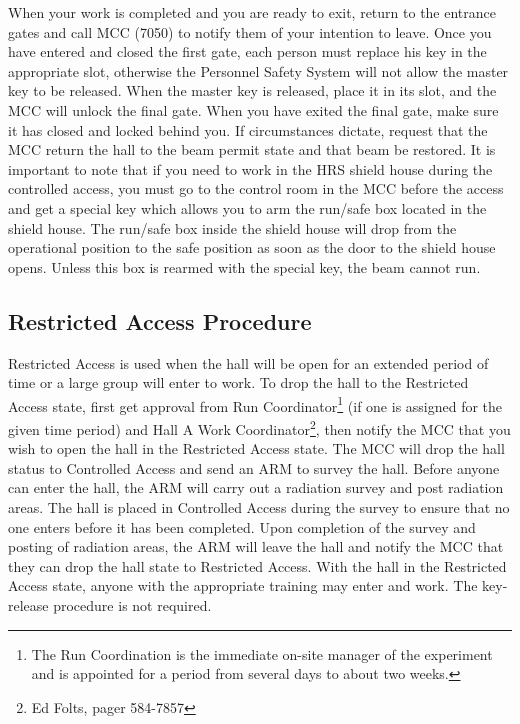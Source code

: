 When your work is completed and you are ready to exit, return to the
entrance gates and call MCC (7050) to notify them of your intention to leave.
 Once you have entered and closed the first gate, each person must
replace his key in the appropriate slot, otherwise the Personnel
Safety System will not allow the master key to be released. When the
master key is released, place it in its slot, and the MCC will unlock
the final gate. When you have exited the final gate, make sure it has
closed and locked behind you. If circumstances dictate, request that
the MCC return the hall to the beam permit state and that beam be
restored.  It is important to note that if you need to work in the HRS
shield house during the controlled access, you must go to the control
room in the MCC before the access and get a special key which allows
you to arm the run/safe box located in the shield house. The run/safe
box inside the shield house will drop from the operational position to
the safe position as soon as the door to the shield house
opens. Unless this box is rearmed with the special key, the beam
cannot run.

\begin{safetyen}{10}{10}
\subsection{Restricted Access Procedure} 
\end{safetyen}

Restricted Access is used when the hall will be open for an extended
period of time or a large group will enter to work. 
To drop the hall
to the Restricted Access state, first get approval from Run 
Coordinator\footnote{The Run Coordination is the immediate on-site
manager of the experiment and is appointed for a period from
several days to about two weeks.}
(if one is assigned for the given time period)
and Hall A Work Coordinator\footnote{Ed Folts, pager 584-7857},
then notify the MCC that you wish to
open the hall in the Restricted Access state. The MCC will drop the
hall status to Controlled Access and send an ARM to survey the
hall. Before anyone can enter the hall, the ARM will carry out a
radiation survey and post radiation areas.  The hall is placed in
Controlled Access during the survey to ensure that no one enters
before it has been completed. Upon completion of the survey and
posting of radiation areas, the ARM will leave the hall and notify the
MCC that they can drop the hall state to Restricted Access. With the
hall in the Restricted Access state, anyone with the appropriate
training may enter and work.  The key- release procedure is not
required.
 
